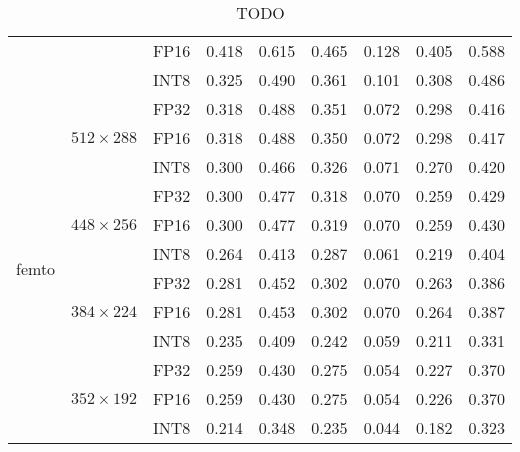 \begin{appendices}
\begin{table}[H]
\begin{tabular}{|c|c|c|rrrrrr|}
                                    &                                  & FP16 & 0.418 & 0.615 & 0.465 & 0.128 & 0.405 & 0.588 \\
                                    &                                  & INT8 & 0.325 & 0.490 & 0.361 & 0.101 & 0.308 & 0.486 \\
        \hline
        \multirow{12}{*}{femto}      & \multirow{3}{*}{$512\times288$}  & FP32 & 0.318 & 0.488 & 0.351 & 0.072 & 0.298 & 0.416 \\
                                    &                                  & FP16 & 0.318 & 0.488 & 0.350 & 0.072 & 0.298 & 0.417 \\
                                    &                                  & INT8 & 0.300 & 0.466 & 0.326 & 0.071 & 0.270 & 0.420 \\
        \cline{2-9}
                                    & \multirow{3}{*}{$448\times256$}  & FP32 & 0.300 & 0.477 & 0.318 & 0.070 & 0.259 & 0.429 \\
                                    &                                  & FP16 & 0.300 & 0.477 & 0.319 & 0.070 & 0.259 & 0.430 \\
                                    &                                  & INT8 & 0.264 & 0.413 & 0.287 & 0.061 & 0.219 & 0.404 \\
        \cline{2-9}
                                    & \multirow{3}{*}{$384\times224$}  & FP32 & 0.281 & 0.452 & 0.302 & 0.070 & 0.263 & 0.386 \\
                                    &                                  & FP16 & 0.281 & 0.453 & 0.302 & 0.070 & 0.264 & 0.387 \\
                                    &                                  & INT8 & 0.235 & 0.409 & 0.242 & 0.059 & 0.211 & 0.331 \\
        \cline{2-9}
                                    & \multirow{3}{*}{$352\times192$}  & FP32 & 0.259 & 0.430 & 0.275 & 0.054 & 0.227 & 0.370 \\
                                    &                                  & FP16 & 0.259 & 0.430 & 0.275 & 0.054 & 0.226 & 0.370 \\
                                    &                                  & INT8 & 0.214 & 0.348 & 0.235 & 0.044 & 0.182 & 0.323 \\
        \hline
    \end{tabular}
    \normalsize
    \caption{TODO}
\end{table}





\end{appendices}

% 